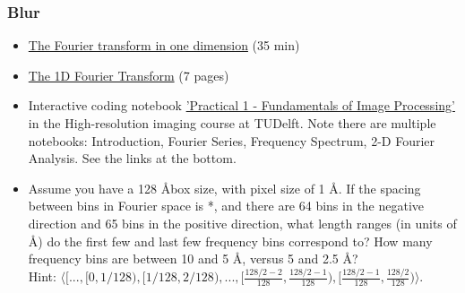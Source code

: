 \documentclass[11pt, oneside]{article}   	%
\begin{document}
\subsubsection{Blur}
\begin{itemize}
	\item \href{https://yale.app.box.com/s/qzgp41qznzw0k6gg5wqsx2uwmpz2n1gx}{The Fourier transform in one dimension} (35 min)
	\item \href{https://cryoemprinciples.yale.edu/sites/default/files/files/3%20Fourier1D.pdf}{The 1D Fourier Transform} (7 pages)
	\item Interactive coding notebook \href{https://gitlab.tudelft.nl/aj-lab/teaching/-/wikis/NB4020}{'Practical 1 - Fundamentals of Image Processing'} in the High-resolution imaging course at TUDelft. Note there are multiple notebooks: Introduction, Fourier Series, Frequency Spectrum, 2-D Fourier Analysis. See the links at the bottom.
\end{itemize}
\begin{itemize}
	\item Assume you have a 128 \AA box size, with pixel size of 1 \AA. If the spacing between bins in Fourier space is *, and there are 64 bins in the negative direction and 65 bins in the positive direction, what length ranges (in units of \AA) do the first few and last few frequency bins correspond to?  How many frequency bins are between 10 and 5 \AA, versus 5 and 2.5 \AA? \\ Hint: $\langle[..., [0,1/128), [1/128,2/128), ... , [\frac{128/2-2}{128}, \frac{128/2-1}{128}),  [\frac{128/2-1}{128}, \frac{128/2}{128})\rangle$.
\end{itemize}
\end{document}
